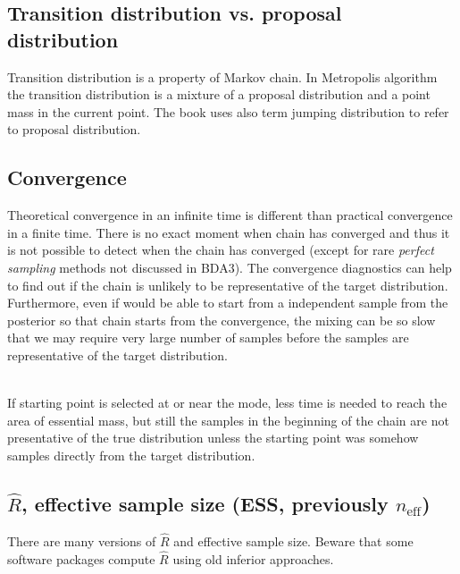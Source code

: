 \documentclass[a4paper,11pt,english]{article}
\def\eff{\mathrm{eff}}
\begin{document}
\subsection*{Transition distribution vs. proposal distribution}

Transition distribution is a property of Markov chain. In Metropolis
algorithm the transition distribution is a mixture of a proposal
distribution and a point mass in the current point. The book uses also
term jumping distribution to refer to proposal distribution.

\subsection*{Convergence}

Theoretical convergence in an infinite time is different than
practical convergence in a finite time. There is no exact moment when
chain has converged and thus it is not possible to detect when the
chain has converged (except for rare \emph{perfect sampling} methods
not discussed in BDA3). The convergence diagnostics can help to find
out if the chain is unlikely to be representative of the target
distribution. Furthermore, even if would be able to start from a
independent sample from the posterior so that chain starts from the
convergence, the mixing can be so slow that we may require very large
number of samples before the samples are representative of the target
distribution.

~\\
If starting point is selected at or near the mode, less time is needed
to reach the area of essential mass, but still the samples in the
beginning of the chain are not presentative of the true distribution
unless the starting point was somehow samples directly from the target
distribution. 

\subsection*{$\widehat{R}$, effective sample size (ESS, previously $n_\eff$)}

There are many versions of $\widehat{R}$ and effective sample size. Beware
that some software packages compute $\widehat{R}$ using old inferior
approaches.
\end{document}
